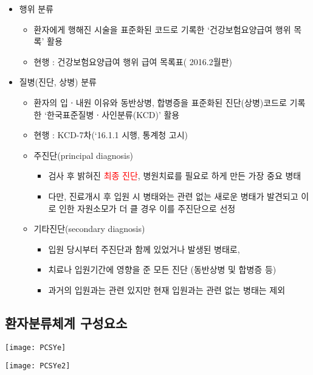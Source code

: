 \begin{tcolorbox}[frogbox,title=환자분류체계 사용 정보]
\begin{itemize}\tightlist
\item 행위 분류
	\begin{itemize}\tightlist
	\item 환자에게 행해진 시술을 표준화된 코드로 기록한 ‘건강보험요양급여 행위 목록’ 활용
	\item 현행 : 건강보험요양급여 행위 급여 목록표( 2016.2월판)
	\end{itemize}
\item 질병(진단, 상병) 분류
	\begin{itemize}\tightlist
	\item 환자의 입ㆍ내원 이유와 동반상병, 합병증을 표준화된 진단(상병)코드로 기록한 ‘한국표준질병ㆍ사인분류(KCD)’ 활용
	\item 현행 : KCD-7차(‘16.1.1 시행, 통계청 고시)
	\item 주진단(principal diagnosis)
		\begin{itemize}\tightlist
		\item 검사 후 밝혀진 \textcolor{red}{최종 진단}, 병원치료를 필요로 하게 만든 가장 중요 병태
		\item 다만, 진료개시 후 입원 시 병태와는 관련 없는 새로운 병태가 발견되고 이로 인한 자원소모가 더 클 경우 이를 주진단으로 선정
		\end{itemize}
	\item 기타진단(secondary diagnosis)
		\begin{itemize}\tightlist
		\item 입원 당시부터 주진단과 함께 있었거나 발생된 병태로,
		\item 치료나 입원기간에 영향을 준 모든 진단 (동반상병 및 합병증 등)
		\item 과거의 입원과는 관련 있지만 현재 입원과는 관련 없는 병태는 제외
		\end{itemize}
	\end{itemize}
\end{itemize}
\end{tcolorbox}
\prezi{\clearpage}
\subsection{환자분류체계 구성요소}
\begin{center}
\texttt{[image: PCSYe]}
\end{center}
\prezi{\clearpage}
\begin{center}
\texttt{[image: PCSYe2]}
\end{center}
\prezi{\clearpage}
